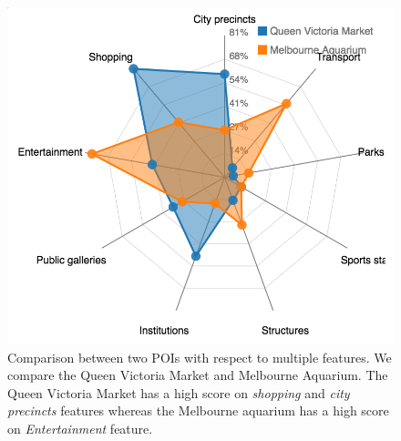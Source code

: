 \begin{figure}[t!]
\includegraphics[width=0.8\linewidth]{figure/sample_radar.png}
\caption{Comparison between two POIs with respect to multiple features. We compare the Queen Victoria Market and Melbourne Aquarium. The Queen Victoria Market has a high score on \textit{shopping} and \textit{city precincts} features whereas the Melbourne aquarium has a high score on \textit{Entertainment} feature.}
\label{fig:radar}
\end{figure}